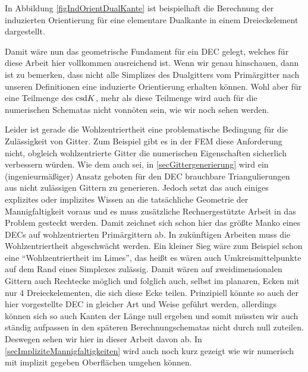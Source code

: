     In Abbildung \ref{figIndOrientDualKante} ist beispielhaft die Berechnung der induzierten Orientierung für eine elementare 
    Dualkante in einem Dreieckelement dargestellt. 

  \begin{fazit}
    Damit wäre nun das geometrische Fundament für ein DEC gelegt, welches für diese Arbeit hier vollkommen ausreichend ist.
    Wenn wir genau hinschauen, dann ist zu bemerken, dass nicht alle Simplizes des Dualgitters vom Primärgitter nach unseren Definitionen eine induzierte Orientierung erhalten können.
    Wohl aber für eine Teilmenge des \( \text{csd} K \), mehr als diese Teilmenge wird auch für die
    numerischen Schematas nicht vonnöten sein, wie wir noch sehen werden.
    
    Leider ist gerade die Wohlzentriertheit eine problematische Bedingung für die Zulässig\-keit von Gitter.
    Zum Beispiel gibt es in der FEM diese Anforderung nicht, obgleich wohlzentrierte Gitter die numerischen Eigenschaften sicherlich verbessern würden.
    Wie dem auch sei, in \ref{secGittergenerierung} wird ein (ingenieurmäßiger) Ansatz geboten für den DEC brauchbare Triangulierungen aus nicht zulässigen Gittern zu generieren.
    Jedoch setzt das auch einiges explizites oder implizites Wissen an die tatsächliche Geometrie der Mannigfaltigkeit voraus und es muss zusätzliche Rechnergestützte Arbeit in das Problem
    gesteckt werden. Damit zeichnet sich schon hier das größte Manko eines DECs auf wohlzentrierten Primärgittern ab.
    In zukünftigen Arbeiten muss die Wohlzentriertheit abgeschwächt werden.
    Ein kleiner Sieg wäre zum Beispiel schon eine "`Wohlzentriertheit im Limes"', das heißt es wären auch Umkreismittelpunkte auf dem Rand eines Simplexes zulässig.
    Damit wären auf zweidimensionalen Gittern auch Rechtecke möglich und folglich auch, selbst im planaren, Ecken mit nur 4 Dreieckelementen, die sich diese Ecke teilen.
    Prinzipiell könnte so auch der hier vorgestellte DEC in gleicher Art und Weise geführt werden, allerdings können sich so auch Kanten der Länge null ergeben und somit müssten wir auch
    ständig aufpassen in den späteren Berechnungschematas nicht durch null zuteilen. Deswegen sehen wir hier in dieser Arbeit davon ab.
    In \ref{secImpliziteMannigfaltigkeiten} wird auch noch kurz gezeigt wie wir numerisch mit implizit gegeben Oberflächen umgehen können.


\end{fazit}
